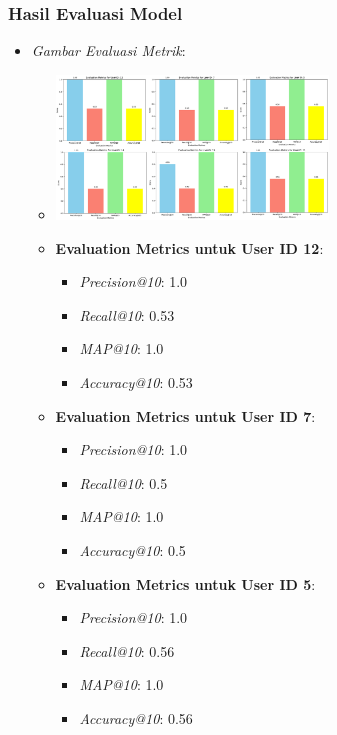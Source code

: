 \documentclass[journal,article,submit,pdftex,moreauthors]{Definitions/mdpi}
\begin{document}
\subsubsection{Hasil Evaluasi Model}
\begin{itemize}
    \item \textit{Gambar Evaluasi Metrik}:
    \begin{itemize}
        \item \includegraphics[width=0.6\textwidth]{images/Tabel.png}
        \item \textbf{Evaluation Metrics untuk User ID 12}:
        \begin{itemize}
            \item \textit{Precision@10}: 1.0
            \item \textit{Recall@10}: 0.53
            \item \textit{MAP@10}: 1.0
            \item \textit{Accuracy@10}: 0.53
        \end{itemize}
        \item \textbf{Evaluation Metrics untuk User ID 7}:
        \begin{itemize}
            \item \textit{Precision@10}: 1.0
            \item \textit{Recall@10}: 0.5
            \item \textit{MAP@10}: 1.0
            \item \textit{Accuracy@10}: 0.5
        \end{itemize}
        \item \textbf{Evaluation Metrics untuk User ID 5}:
        \begin{itemize}
            \item \textit{Precision@10}: 1.0
            \item \textit{Recall@10}: 0.56
            \item \textit{MAP@10}: 1.0
            \item \textit{Accuracy@10}: 0.56
        \end{itemize}

\end{itemize}
\end{itemize}
\end{document}
